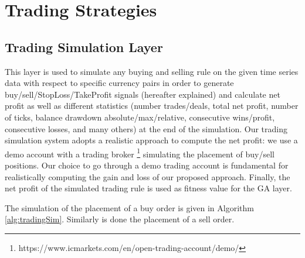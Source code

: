 \section{Trading Strategies}

\subsection{Trading Simulation Layer}
\label{subsection:trading}
This layer is used to simulate any buying and selling rule on the given time series data with respect to specific currency pairs in order to generate buy/sell/StopLoss/TakeProfit signals (hereafter explained) and calculate net profit as well as different statistics (number trades/deals, total net profit, number of ticks, balance drawdown absolute/max/relative, consecutive wins/profit, consecutive losses, and many others) at the end of the simulation. Our trading simulation system adopts a realistic approach to compute the net profit: we use a demo account with a trading broker \footnote{https://www.icmarkets.com/en/open-trading-account/demo/} simulating the placement of buy/sell positions. Our choice to go through a demo trading account is fundamental for realistically computing the gain and loss of our proposed approach. Finally, the net profit of the simulated trading rule is used as fitness value for the GA layer. 

The simulation of the placement of a buy order is given in Algorithm \ref{alg:tradingSim}. Similarly is done the placement of a sell order.

